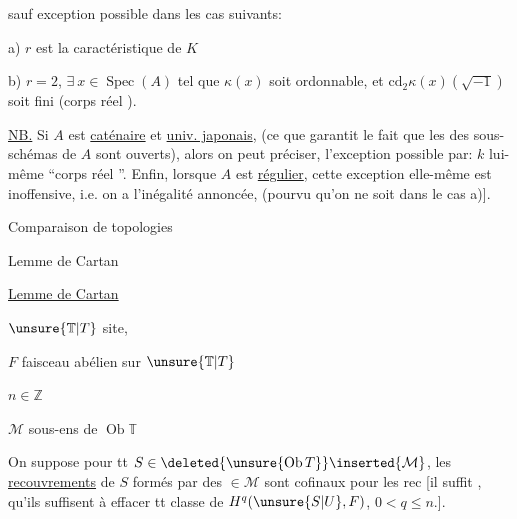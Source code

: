 sauf exception possible dans les cas suivants:

a) $r$ est la caractéristique de $K$

b) $r=2$, 
$\exists\ x\in\operatorname{Spec}(A)$ tel que $\kappa(x)$
soit ordonnable, et $\mathrm{cd}_2\kappa(x)(\sqrt{-1})$ soit fini
(corps réel ).

\uline{NB.} Si $A$ est \uline{caténaire} et \uline{univ. japonais},
(ce que garantit le fait que les 
des sous-schémas de $A$ sont ouverts), alors
 on peut préciser,  l'exception
possible par: $k$ lui-même ``corps réel ''.
Enfin, lorsque $A$ est \uline{régulier},
cette exception elle-même est inoffensive, i.e.
on a l'inégalité annoncée, (pourvu qu'on ne
soit dans le cas a)].

Comparaison de topologies \unsure{\ldots}

Lemme de Cartan

\uline{Lemme de Cartan}

$\unsure{\mathbb T|T}$  site, 

$F$ faisceau abélien sur $\unsure{\mathbb T|T}$

$n\in\mathbb Z$


$\mathcal M$ sous-ens de $\operatorname{Ob}\mathbb T$ 

On suppose 
pour tt $S\in\deleted{\unsure{\operatorname{Ob}T}}\inserted{\mathcal M}$, 
les \uline{recouvrements} de $S$ formés par des $\in\mathcal M$ sont
cofinaux pour les rec [il suffit \unsure{$=$}, qu'ils
suffisent à effacer  tt classe
de $H^q(\unsure{S|U},F)$, $0<q\leq n$.].

